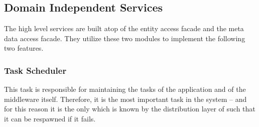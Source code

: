 \documentclass[a4paper, 10pt]{book}
\begin{document}
                                \subsection{Domain Independent Services}
                                \label{sec:high-level-services}

                                The high level services are built atop of the entity access facade and
                                the meta data access facade. They utilize these two modules to
                                implement the following two features.



                                \subsubsection{Task Scheduler}

                                This task is responsible for maintaining the tasks of the application
                                and of the middleware itself. Therefore, it is the most important task
                                in the system -- and for this reason it is the only which is known by
                                the distribution layer of \SYNEIGHT such that it can be respawned if it
                                fails.
\end{document}
